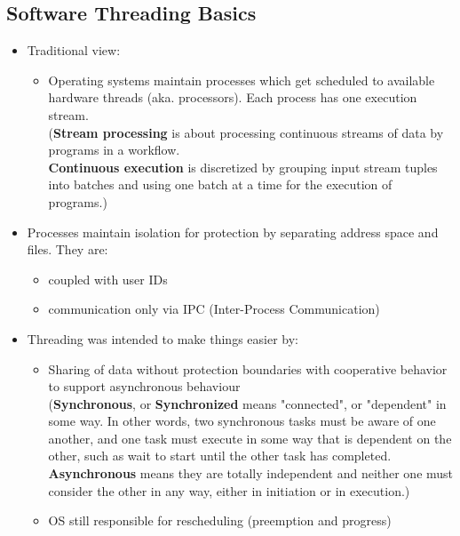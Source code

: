 \documentclass[12pt, a4paper]{report}
\begin{document}
\subsection{Software Threading Basics}
\begin{itemize}
    \item Traditional view:
        \begin{itemize}
            \item Operating systems maintain processes which get scheduled to available hardware threads (aka. processors).
                  Each process has one execution stream.\\
                  ({\bfseries{Stream processing}} is about processing continuous streams of data by programs in a workflow.\\ 
                  {\bfseries {Continuous execution}} is discretized by grouping input stream tuples into batches and 
                  using one batch at a time for the execution of programs.)
        \end{itemize}
    \item Processes maintain isolation for protection by separating address space and files. They are:
        \begin{itemize}
            \item coupled with user IDs 
            \item communication only via IPC (Inter-Process Communication)
        \end{itemize}
    \item Threading was intended to make things easier by:
        \begin{itemize}
            \item Sharing of data without protection boundaries with cooperative behavior to support asynchronous 
                  behaviour\\
                  ({\bfseries{Synchronous}}, or {\bfseries{Synchronized}} means "connected", or "dependent" in some way.
                  In other words, two synchronous tasks must be aware of one another, and one task must execute in some 
                  way that is dependent on the other, such as wait to start until the other task has completed.\\
                  {\bfseries Asynchronous} means they are totally independent and neither one must consider the other in
                  any way, either in initiation or in execution.)
            \item OS still responsible for rescheduling (preemption and progress)
        \end{itemize}
\end{itemize}
\end{document}
